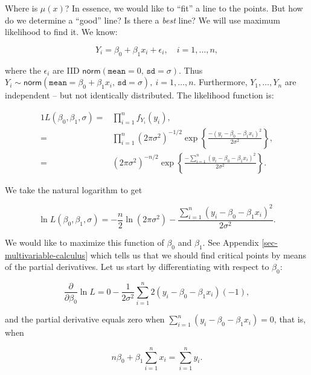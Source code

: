 \documentclass[]{book}
\numberwithin{equation}{chapter}
\numberwithin{figure}{chapter}
\theoremstyle{plain}
\theoremstyle{definition}
\theoremstyle{remark}
\theoremstyle{definition}
\theoremstyle{definition}
\theoremstyle{remark}
\begin{document}
Where is \(\mu(x)\)? In essence, we would like to ``fit'' a line to the
points. But how do we determine a ``good'' line? Is there a \emph{best}
line? We will use maximum likelihood  to find
it. We know:

\begin{equation}
Y_{i} = \beta_{0} + \beta_{1}x_{i} + \epsilon_{i},\quad i=1,\ldots,n,
\end{equation}

where the \(\epsilon_{i}\) are IID
\(\mathsf{norm}(\mathtt{mean}=0,\,\mathtt{sd}=\sigma)\). Thus
\(Y_{i}\sim\mathsf{norm}(\mathtt{mean}=\beta_{0}+\beta_{1}x_{i},\,\mathtt{sd}=\sigma),\
i=1,\ldots,n\). Furthermore, \(Y_{1},\ldots,Y_{n}\) are independent --
but not identically distributed. The likelihood function
 is:

\begin{alignat}{1}
L(\beta_{0},\beta_{1},\sigma)= & \prod_{i=1}^{n}f_{Y_{i}}(y_{i}),\\
= & \prod_{i=1}^{n}(2\pi\sigma^{2})^{-1/2}\exp\left\{ \frac{-(y_{i}-\beta_{0}-\beta_{1}x_{i})^{2}}{2\sigma^{2}}\right\} ,\\
= & (2\pi\sigma^{2})^{-n/2}\exp\left\{ \frac{-\sum_{i=1}^{n}(y_{i}-\beta_{0}-\beta_{1}x_{i})^{2}}{2\sigma^{2}}\right\} .
\end{alignat}

We take the natural logarithm to get

\begin{equation}
\label{eq-regML-lnL}
\ln L(\beta_{0},\beta_{1},\sigma)=-\frac{n}{2}\ln(2\pi\sigma^{2})-\frac{\sum_{i=1}^{n}(y_{i}-\beta_{0}-\beta_{1}x_{i})^{2}}{2\sigma^{2}}.
\end{equation}

We would like to maximize this function of \(\beta_{0}\) and
\(\beta_{1}\). See Appendix \ref{sec-multivariable-calculus} which tells
us that we should find critical points by means of the partial
derivatives. Let us start by differentiating with respect to
\(\beta_{0}\):

\begin{equation}
\frac{\partial}{\partial\beta_{0}}\ln L=0-\frac{1}{2\sigma^{2}}\sum_{i=1}^{n}2(y_{i}-\beta_{0}-\beta_{1}x_{i})(-1),
\end{equation}

and the partial derivative equals zero when
\(\sum_{i=1}^{n}(y_{i}-\beta_{0}-\beta_{1}x_{i}) = 0\), that is, when

\begin{equation}
\label{eq-regML-a}
n \beta_{0} + \beta_{1} \sum_{i=1}^{n} x_{i} = \sum_{i = 1}^{n}y_{i}.
\end{equation}
\end{document}
